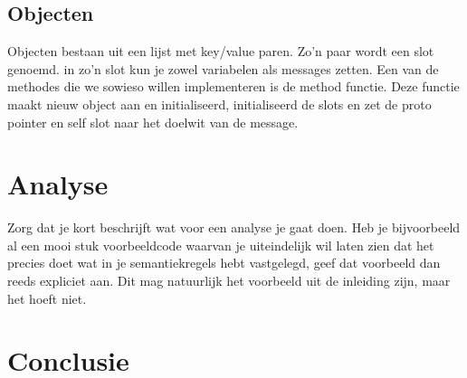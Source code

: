 \documentclass[12pt]{article}
\begin{document}
\subsection{Objecten}
Objecten bestaan uit een lijst met key/value paren. Zo'n paar wordt een slot genoemd.
in zo'n slot kun je zowel variabelen als messages zetten.
Een van de methodes die we sowieso willen implementeren is de method functie. 
Deze functie maakt nieuw object aan en initialiseerd, initialiseerd de slots en zet de proto pointer en self slot naar het doelwit van de message. 

\section{Analyse}
Zorg dat je kort beschrijft wat voor een analyse je gaat doen. Heb je bijvoorbeeld al een mooi stuk voorbeeldcode waarvan je uiteindelijk wil laten zien dat het precies doet wat in je semantiekregels hebt vastgelegd, geef dat voorbeeld dan reeds expliciet aan. Dit mag natuurlijk het voorbeeld uit de inleiding zijn, maar het hoeft niet.

\section{Conclusie}

\appendix
\end{document}
